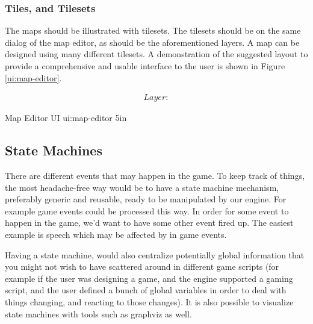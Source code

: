 \subsubsection{Tiles, and Tilesets}

The maps should be illustrated with tilesets. The tilesets should be on the
same dialog of the map editor, as should be the aforementioned layers. A map
can be designed using many different tilesets. A demonstration of the
suggested layout to provide a comprehensive and usable interface to the user
is shown in Figure \ref{ui:map-editor}.

\begin{equation}
\begin{split}
Layer\colon 
\end{split}
\end{equation}

%
       {Map Editor UI}%
       {ui:map-editor}%
       {5in}


\subsection{State Machines}

There are different events that may happen in the game. To keep track of 
things, the most headache-free way would be to have a state machine mechanism,
preferably generic and reusable, ready to be manipulated by our engine. For
example game events could be processed this way. In order for some event to
happen in the game, we'd want to have some other event fired up. The easiest
example is speech which may be affected by in game events.

Having a state machine, would also centralize potentially global information
that you might not wish to have scattered around in different game scripts (for
example if the user was designing a game, and the engine supported a gaming
script, and the user defined a bunch of global variables in order to deal with
things changing, and reacting to those changes). It is also possible to visualize
state machines with tools such as graphviz as well.
